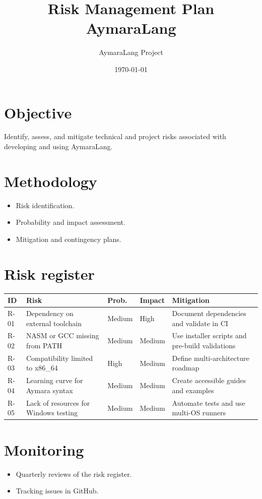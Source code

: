 \documentclass[11pt,a4paper]{article}
\title{Risk Management Plan\\AymaraLang}
\author{AymaraLang Project}
\date{\today}
\begin{document}
\maketitle

\section{Objective}
Identify, assess, and mitigate technical and project risks associated with developing and using AymaraLang.

\section{Methodology}
\begin{itemize}
    \item Risk identification.
    \item Probability and impact assessment.
    \item Mitigation and contingency plans.
\end{itemize}

\section{Risk register}
\begin{longtable}{@{}p{1cm}p{5cm}p{2cm}p{2cm}p{5cm}@{}}
\toprule
\textbf{ID} & \textbf{Risk} & \textbf{Prob.} & \textbf{Impact} & \textbf{Mitigation} \\ \midrule
R-01 & Dependency on external toolchain & Medium & High & Document dependencies and validate in CI \\
R-02 & NASM or GCC missing from PATH & Medium & Medium & Use installer scripts and pre-build validations \\
R-03 & Compatibility limited to x86\_64 & High & Medium & Define multi-architecture roadmap \\
R-04 & Learning curve for Aymara syntax & Medium & Medium & Create accessible guides and examples \\
R-05 & Lack of resources for Windows testing & Medium & Medium & Automate tests and use multi-OS runners \\ \bottomrule
\end{longtable}

\section{Monitoring}
\begin{itemize}
    \item Quarterly reviews of the risk register.
    \item Tracking issues in GitHub.
\end{itemize}
\end{document}
